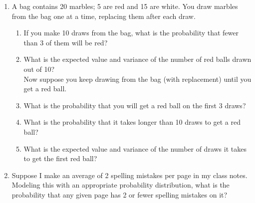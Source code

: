 \documentclass[12pt]{article}
\begin{document}
\begin{enumerate}
\item A bag contains 20 marbles; 5 are red and 15 are white. You draw marbles from the bag one at a time, replacing them after each draw.

\begin{enumerate}
\item If you make 10 draws from the bag, what is the probability that fewer than 3 of them will be red?\\

\item What is the expected value and variance of the number of red balls drawn out of 10?\\

Now suppose you keep drawing from the bag (with replacement) until you get a red ball.

\item What is the probability that you will get a red ball on the first 3 draws?\\

\item What is the probability that it takes longer than 10 draws to get a red ball?\\

\item What is the expected value and variance of the number of draws it takes to get the first red ball?\\

\end{enumerate}

\item Suppose I make an average of 2 spelling mistakes per page in my class notes. Modeling this with an appropriate probability distribution, what is the probability that any given page has 2 or fewer spelling mistakes on it?\\


\end{enumerate}
\end{document}
